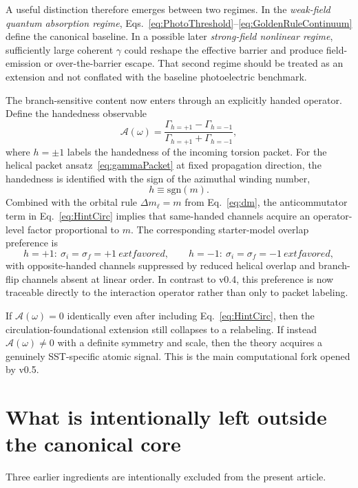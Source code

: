 \documentclass[11pt,a4paper]{article}
\begin{document}
A useful distinction therefore emerges between two regimes. In the \emph{weak-field quantum absorption regime}, Eqs.~\eqref{eq:PhotoThreshold}--\eqref{eq:GoldenRuleContinuum} define the canonical baseline. In a possible later \emph{strong-field nonlinear regime}, sufficiently large coherent $\gamma$ could reshape the effective barrier and produce field-emission or over-the-barrier escape. That second regime should be treated as an extension and not conflated with the baseline photoelectric benchmark.

The branch-sensitive content now enters through an explicitly handed operator. Define the handedness observable
\begin{equation}
\label{eq:Asymmetry}
\boxed{
\mathcal A(\omega)
=
\frac{\Gamma_{h=+1}-\Gamma_{h=-1}}{\Gamma_{h=+1}+\Gamma_{h=-1}},
}
\end{equation}
where $h=\pm 1$ labels the handedness of the incoming torsion packet. For the helical packet ansatz~\eqref{eq:gammaPacket} at fixed propagation direction, the handedness is identified with the sign of the azimuthal winding number,
\begin{equation}
\label{eq:h-sign-m}
\boxed{h\equiv \mathrm{sgn}(m).}
\end{equation}
Combined with the orbital rule $\Delta m_\ell=m$ from Eq.~\eqref{eq:dm}, the anticommutator term in Eq.~\eqref{eq:HintCirc} implies that same-handed channels acquire an operator-level factor proportional to $m$. The corresponding starter-model overlap preference is
\begin{equation}
\label{eq:handed-selection}
 h=+1:\ \sigma_i=\sigma_f=+1\ 	ext{favored},
 \qquad
 h=-1:\ \sigma_i=\sigma_f=-1\ 	ext{favored},
\end{equation}
with opposite-handed channels suppressed by reduced helical overlap and branch-flip channels absent at linear order. In contrast to v0.4, this preference is now traceable directly to the interaction operator rather than only to packet labeling.

If $\mathcal A(\omega)=0$ identically even after including Eq.~\eqref{eq:HintCirc}, then the circulation-foundational extension still collapses to a relabeling. If instead $\mathcal A(\omega)\neq 0$ with a definite symmetry and scale, then the theory acquires a genuinely SST-specific atomic signal. This is the main computational fork opened by v0.5.

\section{What is intentionally left outside the canonical core}
Three earlier ingredients are intentionally excluded from the present article.
\end{document}
